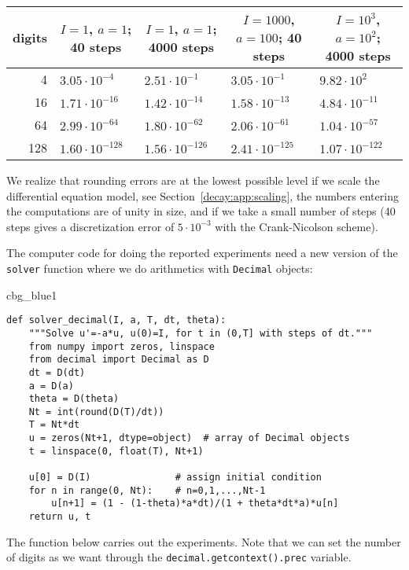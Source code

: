 \documentclass[graybox,sectrefs,envcountresetchap,open=right,final]{svmonodo}
\newenvironment{_cod_tight}[1]{
   \def\FrameCommand{\colorbox{#1}}
   \FrameRule0.6pt\MakeFramed {\FrameRestore}\vskip3mm}
   {\vskip0mm\endMakeFramed}
\newenvironment{cod}[1]{
\bgroup\rmfamily
\fboxsep=0mm\relax
\begin{_cod_tight}{#1}
\list{}{\parsep=-2mm\parskip=0mm\topsep=0pt\leftmargin=2mm
\rightmargin=2\leftmargin\leftmargin=4pt\relax}
\item\relax}
{\endlist\end{_cod_tight}\egroup}
\begin{document}
{\small   %

\vspace{4mm}

\begin{tabular}{rllll}
\hline
\multicolumn{1}{c}{ digits } & \multicolumn{1}{c}{ $I=1$, $a=1$; 40 steps } & \multicolumn{1}{c}{ $I=1$, $a=1$; 4000 steps } & \multicolumn{1}{c}{ $I=1000$, $a=100$; 40 steps } & \multicolumn{1}{c}{ $I=10^3$, $a=10^2$; 4000 steps } \\
\hline
4      & $3.05\cdot 10^{-4}$    & $2.51\cdot 10^{-1}$      & $3.05\cdot 10^{-1}$         & $9.82\cdot 10^{2}$             \\
16     & $1.71\cdot 10^{-16}$   & $1.42\cdot 10^{-14}$     & $1.58\cdot 10^{-13}$        & $4.84\cdot 10^{-11}$           \\
64     & $2.99\cdot 10^{-64}$   & $1.80\cdot 10^{-62}$     & $2.06\cdot 10^{-61}$        & $1.04\cdot 10^{-57}$           \\
128    & $1.60\cdot 10^{-128}$  & $1.56\cdot 10^{-126}$    & $2.41\cdot 10^{-125}$       & $1.07\cdot 10^{-122}$          \\
\hline
\end{tabular}

\vspace{4mm}

}


\noindent
We realize that rounding errors are at the lowest possible level
if we scale the differential equation model,
see Section~\ref{decay:app:scaling},
the numbers entering the computations are of unity in size,
and if we take a small number of steps (40 steps gives a discretization error
of $5\cdot 10^{-3}$ with the Crank-Nicolson scheme).

The computer code for doing the reported experiments need a new version
of the \texttt{solver} function where we do arithmetics with \texttt{Decimal}
objects:

\begin{cod}{cbg_blue1}\begin{Verbatim}[numbers=none,fontsize=\fontsize{9pt}{9pt},baselinestretch=0.95,xleftmargin=2mm]
def solver_decimal(I, a, T, dt, theta):
    """Solve u'=-a*u, u(0)=I, for t in (0,T] with steps of dt."""
    from numpy import zeros, linspace
    from decimal import Decimal as D
    dt = D(dt)
    a = D(a)
    theta = D(theta)
    Nt = int(round(D(T)/dt))
    T = Nt*dt
    u = zeros(Nt+1, dtype=object)  # array of Decimal objects
    t = linspace(0, float(T), Nt+1)

    u[0] = D(I)               # assign initial condition
    for n in range(0, Nt):    # n=0,1,...,Nt-1
        u[n+1] = (1 - (1-theta)*a*dt)/(1 + theta*dt*a)*u[n]
    return u, t
\end{Verbatim}
\end{cod}
\noindent
The function below carries out the experiments. Note that we can
set the number of digits as we want through the \texttt{decimal.getcontext().prec}
variable.
\end{document}
